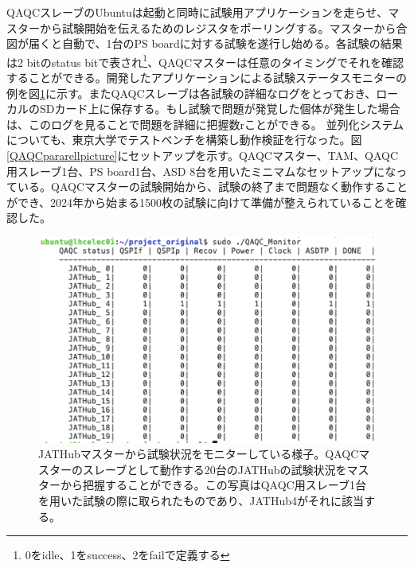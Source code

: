 QAQCスレーブのUbuntuは起動と同時に試験用アプリケーションを走らせ、マスターから試験開始を伝えるためのレジスタをポーリングする。マスターから合図が届くと自動で、1台のPS boardに対する試験を遂行し始める。各試験の結果は2 bitのstatus bitで表され\footnote{0をidle、1をsuccess、2をfailで定義する}、QAQCマスターは任意のタイミングでそれを確認することができる。開発したアプリケーションによる試験ステータスモニターの例を図\ref{QAQC_monitor}に示す。またQAQCスレーブは各試験の詳細なログをとっておき、ローカルのSDカード上に保存する。もし試験で問題が発覚した個体が発生した場合は、このログを見ることで問題を詳細に把握数rことができる。
並列化システムについても、東京大学でテストベンチを構築し動作検証を行なった。図\ref{QAQCpararellpicture}にセットアップを示す。QAQCマスター、TAM、QAQC用スレーブ1台、PS board1台、ASD 8台を用いたミニマムなセットアップになっている。QAQCマスターの試験開始から、試験の終了まで問題なく動作することができ、2024年から始まる1500枚の試験に向けて準備が整えられていることを確認した。

\begin{figure} 
\centering
\includegraphics[width=16cm]{fig/QAQC/QAQC_monitor.png}
\caption[JATHubマスターからの試験状況のモニター]{JATHubマスターから試験状況をモニターしている様子。QAQCマスターのスレーブとして動作する20台のJATHubの試験状況をマスターから把握することができる。この写真はQAQC用スレーブ1台を用いた試験の際に取られたものであり、JATHub4がそれに該当する。}
\label{QAQC_monitor}
\end{figure}


